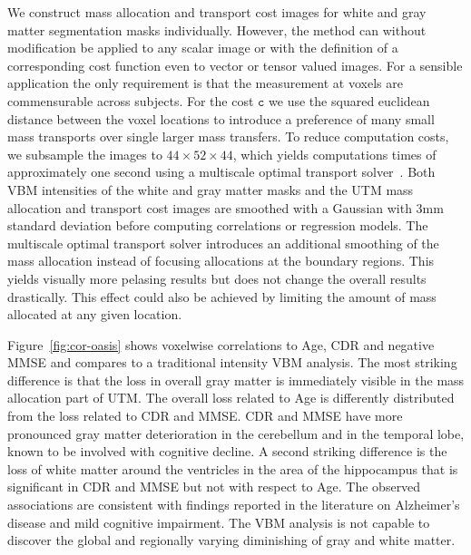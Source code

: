 \documentclass{llncs}
\newcommand{\cost}[0]{\mathtt{c}}
\begin{document}
We construct mass allocation and transport cost images for white and gray
matter segmentation masks individually. However, the method can without
modification be applied to any scalar image or with the definition of a
corresponding cost function even to vector or tensor valued images. For a
sensible application the only requirement is that the measurement at voxels are
commensurable across subjects. For the cost $\cost$ we use the squared
euclidean distance between the voxel locations to introduce a preference of
many small mass transports over single larger mass transfers.  To reduce
computation costs, we subsample the images to $44 \times 52 \times 44$, which
yields computations times of approximately one second using a multiscale
optimal transport solver~\cite{gerber2017multiscale}. Both VBM intensities of
the white and gray matter masks and the UTM mass allocation and transport cost
images are smoothed with a Gaussian with 3mm standard deviation before
computing correlations or regression models. The multiscale optimal transport
solver introduces an additional smoothing of the mass allocation instead of
focusing allocations at the boundary regions. This yields visually more
pelasing results but does not change the overall results drastically. This
effect could also be achieved by limiting the amount of mass allocated at any
given location.


Figure~\ref{fig:cor-oasis} shows voxelwise correlations to Age, CDR and
negative MMSE and compares to a traditional intensity VBM analysis. The most
striking difference is that the loss in overall gray matter is immediately
visible in the mass allocation part of UTM. The overall loss related to Age is
differently distributed from the loss related to CDR and MMSE. CDR and MMSE
have more pronounced gray matter deterioration in the cerebellum and in the
temporal lobe, known to be involved with cognitive decline. A second striking
difference is the loss of white matter around the ventricles in the area of the
hippocampus that is significant in CDR and MMSE but not with respect to Age.
The observed associations are consistent with findings reported in the
literature on Alzheimer's disease and mild cognitive impairment.  The VBM
analysis is not capable to discover the global and regionally varying
diminishing of gray and white matter. 
\end{document}
